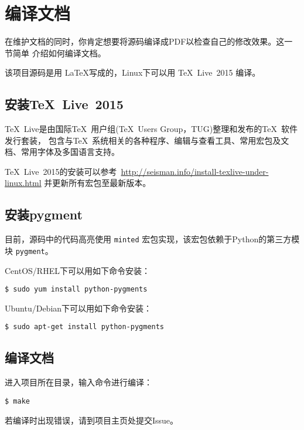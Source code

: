 \section{编译文档}
在维护文档的同时，你肯定想要将源码编译成PDF以检查自己的修改效果。这一节简单
介绍如何编译文档。

该项目源码是用 \LaTeX 写成的，Linux下可以用 \TeX~Live~2015 编译。

\subsection{安装\TeX~Live~2015}
\TeX~Live是由国际\TeX~用户组(\TeX~Users Group，TUG)整理和发布的\TeX~软件发行套装，
包含与\TeX~系统相关的各种程序、编辑与查看工具、常用宏包及文档、常用字体及多国语言支持。

\TeX~Live~2015的安装可以参考~\url{http://seisman.info/install-texlive-under-linux.html}
并更新所有宏包至最新版本。

\subsection{安装pygment}
目前，源码中的代码高亮使用 \verb+minted+ 宏包实现，该宏包依赖于Python的第三方模块 \verb+pygment+。

CentOS/RHEL下可以用如下命令安装：
\begin{verbatim}
$ sudo yum install python-pygments
\end{verbatim}

Ubuntu/Debian下可以用如下命令安装：
\begin{verbatim}
$ sudo apt-get install python-pygments
\end{verbatim}

\subsection{编译文档}
进入项目所在目录，输入命令进行编译：
\begin{verbatim}
$ make
\end{verbatim}
若编译时出现错误，请到项目主页处提交Issue。
